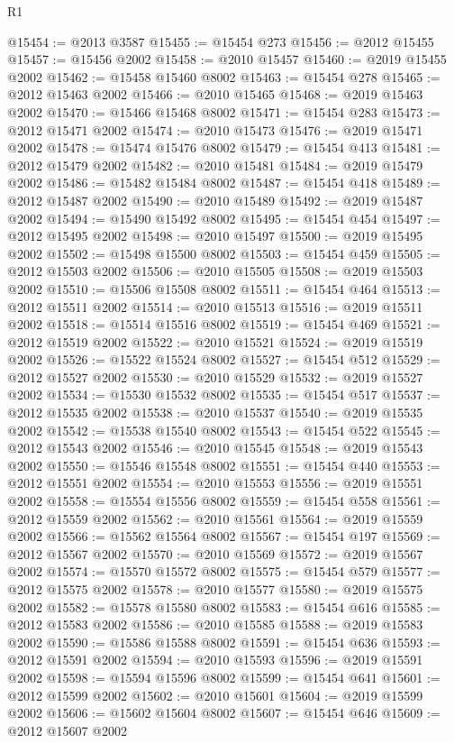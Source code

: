 \begin{lexlean}{R1}
\begin{coremodule}
@15454 := @2013 @3587
@15455 := @15454 @273
@15456 := @2012 @15455
@15457 := @15456 @2002
@15458 := @2010 @15457
@15460 := @2019 @15455 @2002
@15462 := @15458 @15460 @8002
@15463 := @15454 @278
@15465 := @2012 @15463 @2002
@15466 := @2010 @15465
@15468 := @2019 @15463 @2002
@15470 := @15466 @15468 @8002
@15471 := @15454 @283
@15473 := @2012 @15471 @2002
@15474 := @2010 @15473
@15476 := @2019 @15471 @2002
@15478 := @15474 @15476 @8002
@15479 := @15454 @413
@15481 := @2012 @15479 @2002
@15482 := @2010 @15481
@15484 := @2019 @15479 @2002
@15486 := @15482 @15484 @8002
@15487 := @15454 @418
@15489 := @2012 @15487 @2002
@15490 := @2010 @15489
@15492 := @2019 @15487 @2002
@15494 := @15490 @15492 @8002
@15495 := @15454 @454
@15497 := @2012 @15495 @2002
@15498 := @2010 @15497
@15500 := @2019 @15495 @2002
@15502 := @15498 @15500 @8002
@15503 := @15454 @459
@15505 := @2012 @15503 @2002
@15506 := @2010 @15505
@15508 := @2019 @15503 @2002
@15510 := @15506 @15508 @8002
@15511 := @15454 @464
@15513 := @2012 @15511 @2002
@15514 := @2010 @15513
@15516 := @2019 @15511 @2002
@15518 := @15514 @15516 @8002
@15519 := @15454 @469
@15521 := @2012 @15519 @2002
@15522 := @2010 @15521
@15524 := @2019 @15519 @2002
@15526 := @15522 @15524 @8002
@15527 := @15454 @512
@15529 := @2012 @15527 @2002
@15530 := @2010 @15529
@15532 := @2019 @15527 @2002
@15534 := @15530 @15532 @8002
@15535 := @15454 @517
@15537 := @2012 @15535 @2002
@15538 := @2010 @15537
@15540 := @2019 @15535 @2002
@15542 := @15538 @15540 @8002
@15543 := @15454 @522
@15545 := @2012 @15543 @2002
@15546 := @2010 @15545
@15548 := @2019 @15543 @2002
@15550 := @15546 @15548 @8002
@15551 := @15454 @440
@15553 := @2012 @15551 @2002
@15554 := @2010 @15553
@15556 := @2019 @15551 @2002
@15558 := @15554 @15556 @8002
@15559 := @15454 @558
@15561 := @2012 @15559 @2002
@15562 := @2010 @15561
@15564 := @2019 @15559 @2002
@15566 := @15562 @15564 @8002
@15567 := @15454 @197
@15569 := @2012 @15567 @2002
@15570 := @2010 @15569
@15572 := @2019 @15567 @2002
@15574 := @15570 @15572 @8002
@15575 := @15454 @579
@15577 := @2012 @15575 @2002
@15578 := @2010 @15577
@15580 := @2019 @15575 @2002
@15582 := @15578 @15580 @8002
@15583 := @15454 @616
@15585 := @2012 @15583 @2002
@15586 := @2010 @15585
@15588 := @2019 @15583 @2002
@15590 := @15586 @15588 @8002
@15591 := @15454 @636
@15593 := @2012 @15591 @2002
@15594 := @2010 @15593
@15596 := @2019 @15591 @2002
@15598 := @15594 @15596 @8002
@15599 := @15454 @641
@15601 := @2012 @15599 @2002
@15602 := @2010 @15601
@15604 := @2019 @15599 @2002
@15606 := @15602 @15604 @8002
@15607 := @15454 @646
@15609 := @2012 @15607 @2002

\end{coremodule}
\end{lexlean}
